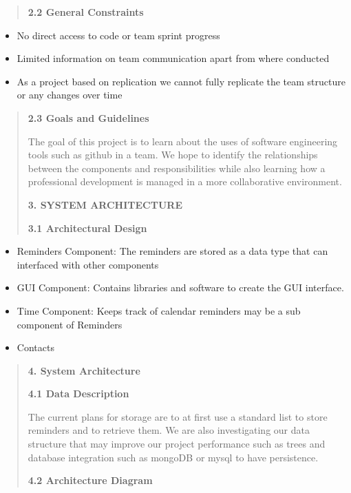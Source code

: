 \documentclass[
]{article}
\begin{document}
\begin{quote}
\textbf{2.2 General Constraints}
\end{quote}

\begin{itemize}
\item
  No direct access to code or team sprint progress
\item
  Limited information on team communication apart from where conducted
\item
  As a project based on replication we cannot fully replicate the team
  structure or any changes over time
\end{itemize}

\begin{quote}
\textbf{2.3 Goals and Guidelines}

The goal of this project is to learn about the uses of software
engineering tools such as github in a team. We hope to identify the
relationships between the components and responsibilities while also
learning how a professional development is managed in a more
collaborative environment.

\textbf{3. SYSTEM ARCHITECTURE}

\textbf{3.1 Architectural Design}
\end{quote}

\begin{itemize}
\item
  Reminders Component: The reminders are stored as a data type that can
  interfaced with other components
\item
  GUI Component: Contains libraries and software to create the GUI
  interface.
\item
  Time Component: Keeps track of calendar reminders may be a sub
  component of Reminders
\item
  Contacts
\end{itemize}

\begin{quote}
\textbf{4. System Architecture}

\textbf{4.1 Data Description}

The current plans for storage are to at first use a standard list to
store reminders and to retrieve them. We are also investigating our data
structure that may improve our project performance such as trees and
database integration such as mongoDB or mysql to have persistence.

\textbf{4.2 Architecture Diagram}
\end{quote}
\end{document}
